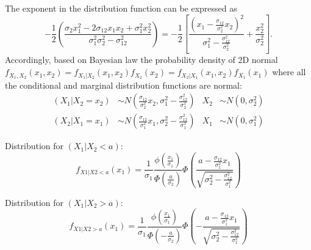 \documentclass[a4paper]{article}
\numberwithin{equation}{subsection}
\begin{document}
The exponent in the distribution function can be expressed as
\begin{equation}
  -\frac{1}{2} \left(
    \frac{
      \sigma_{2}x_{1}^{2} - 2 \sigma_{12} x_{1} x_{2} +
      \sigma_{1}^{2} x_{2}^{2}}
    {\sigma_{1}^{2} \sigma_{2}^{2} - \sigma_{12}^{2}}
  \right)
  =
  -\frac{1}{2} \left[
    \frac{\left(
        x_{1} - 
        \displaystyle\frac{\sigma_{12}}{\sigma_{2}^{2}}x_{2}
      \right)^{2}}
    {\sigma_{1}^{2} - \displaystyle\frac{\sigma_{12}^{2}}{\sigma_{2}^{2}}}
    +
    \frac{x_{2}^{2}}{\sigma_{2}^{2}}
  \right].
  \label{eq:normal2D_exponent}
\end{equation}
Accordingly, based on Bayesian law the probability density of 2D normal
\begin{math}
f_{X_{1},X_{2}}(x_{1},x_{2}) = 
f_{X_{1}|X_{2}}(x_{1},x_{2}) f_{X_{2}}(x_{2}) =
f_{X_{2}|X_{1}}(x_{1},x_{2}) f_{X_{1}}(x_{1})
\end{math}
where all the conditional and marginal distribution functions are
normal:
\begin{align}
  (X_{1}|X_{2} = x_{2}) 
  &\sim
  N \left(
    \frac{\sigma_{12}}{\sigma_{2}^{2}} x_{2},
    \sigma_{1}^{2} - \frac{\sigma_{12}^{2}}{\sigma_{2}^{2}}
  \right)
  &
  X_{2} &\sim N(0, \sigma_{2}^{2})
  \\
  (X_{2}|X_{1} = x_{1}) 
  &\sim
  N \left(
    \frac{\sigma_{12}}{\sigma_{1}^{2}} x_{1},
    \sigma_{2}^{2} - \frac{\sigma_{12}^{2}}{\sigma_{1}^{2}}
  \right)
  &
  X_{1} &\sim N(0, \sigma_{1}^{2})
\end{align}

Distribution for $(X_{1}|X_{2} < a)$:
\begin{equation}
  f_{X1|X2 < a}(x_{1}) = 
  \frac{1}{\sigma_{1}}
  \frac{\phi \left( \frac{x_{1}}{\sigma_{1}} \right)}
  {\Phi \left( \frac{a}{\sigma_{2}} \right)}
  \Phi \left(
    \frac{a - \frac{\sigma_{12}}{\sigma_{1}^{2}} x_{1}}
    {\sqrt{\sigma_{2}^{2} - \frac{\sigma_{12}^{2}}{\sigma_{1}^{2}}}}
  \right)
\end{equation}

Distribution for $(X_{1}|X_{2} > a)$:
\begin{equation}
  f_{X1|X2 > a}(x_{1}) = 
  \frac{1}{\sigma_{1}}
  \frac{\phi \left( \frac{x_{1}}{\sigma_{1}} \right)}
  {\Phi \left( -\frac{a}{\sigma_{2}} \right)}
  \Phi \left(
    - \frac{a - \frac{\sigma_{12}}{\sigma_{1}^{2}} x_{1}}
    {\sqrt{\sigma_{2}^{2} - \frac{\sigma_{12}^{2}}{\sigma_{1}^{2}}}}
  \right)
\end{equation}
\end{document}
